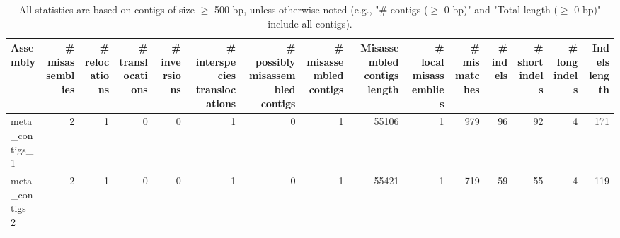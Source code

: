 \documentclass[12pt,a4paper]{article}
\begin{document}
\begin{table}[ht]
\begin{center}
\caption{All statistics are based on contigs of size $\geq$ 500 bp, unless otherwise noted (e.g., "\# contigs ($\geq$ 0 bp)" and "Total length ($\geq$ 0 bp)" include all contigs).}
\begin{tabular}{|l*{14}{|r}|}
\hline
Assembly & \# misassemblies &     \# relocations &     \# translocations &     \# inversions &     \# interspecies translocations & \# possibly misassembled contigs & \# misassembled contigs & Misassembled contigs length & \# local misassemblies & \# mismatches & \# indels &     \# short indels &     \# long indels & Indels length \\ \hline
meta\_contigs\_1 & 2 & 1 & 0 & 0 & 1 & 0 & 1 & 55106 & 1 & 979 & 96 & 92 & 4 & 171 \\ \hline
meta\_contigs\_2 & 2 & 1 & 0 & 0 & 1 & 0 & 1 & 55421 & 1 & 719 & 59 & 55 & 4 & 119 \\ \hline
\end{tabular}
\end{center}
\end{table}
\end{document}
